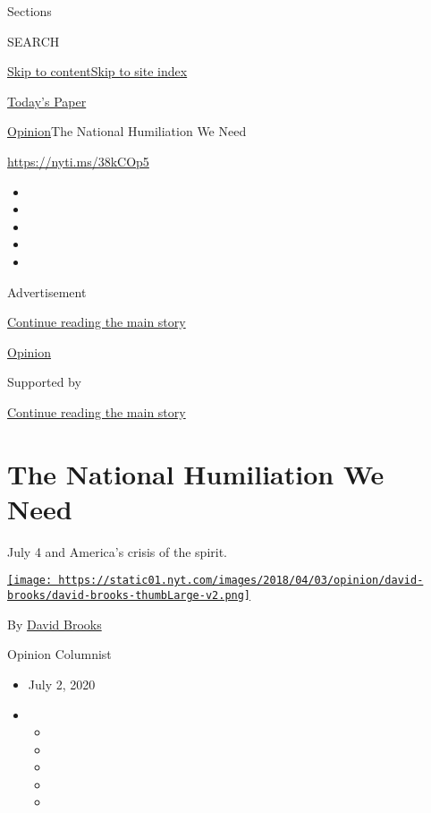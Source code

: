 Sections

SEARCH

\protect\hyperlink{site-content}{Skip to
content}\protect\hyperlink{site-index}{Skip to site index}

\href{https://myaccount.nytimes.com/auth/login?response_type=cookie\&client_id=vi}{}

\href{https://www.nytimes.com/section/todayspaper}{Today's Paper}

\href{/section/opinion}{Opinion}\textbar{}The National Humiliation We
Need

\href{https://nyti.ms/38kCOp5}{https://nyti.ms/38kCOp5}

\begin{itemize}
\item
\item
\item
\item
\item
\end{itemize}

Advertisement

\protect\hyperlink{after-top}{Continue reading the main story}

\href{/section/opinion}{Opinion}

Supported by

\protect\hyperlink{after-sponsor}{Continue reading the main story}

\hypertarget{the-national-humiliation-we-need}{%
\section{The National Humiliation We
Need}\label{the-national-humiliation-we-need}}

July 4 and America's crisis of the spirit.

\href{https://www.nytimes.com/by/david-brooks}{\texttt{[image: https://static01.nyt.com/images/2018/04/03/opinion/david-brooks/david-brooks-thumbLarge-v2.png]}}

By \href{https://www.nytimes.com/by/david-brooks}{David Brooks}

Opinion Columnist

\begin{itemize}
\item
  July 2, 2020
\item
  \begin{itemize}
  \item
  \item
  \item
  \item
  \item
  \end{itemize}
\end{itemize}

